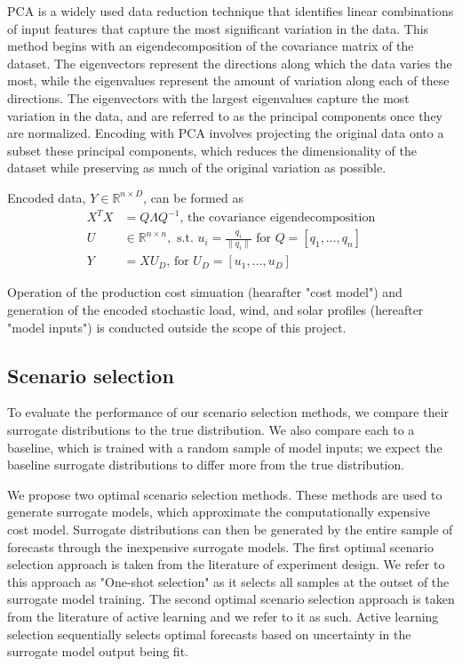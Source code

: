 \documentclass[10pt,twocolumn,letterpaper]{article}
\begin{document}
PCA is a widely used data reduction technique that identifies linear combinations of input features that capture the most significant variation in the data. This method begins with an eigendecomposition of the covariance matrix of the dataset. The eigenvectors represent the directions along which the data varies the most, while the eigenvalues represent the amount of variation along each of these directions. The eigenvectors with the largest eigenvalues capture the most variation in the data, and are referred to as the principal components once they are normalized. Encoding with PCA involves projecting the original data onto a subset these principal components, which reduces the dimensionality of the dataset while preserving as much of the original variation as possible.

Encoded data, $Y \in \mathbb{R}^{n\times D}$, can be formed as 
\begin{align*}
    X^TX &= Q\Lambda Q^{-1} \textrm{, the covariance eigendecomposition}\\
    U &\in \mathbb{R}^{n\times n}, \textrm{ s.t. } u_i = \frac{q_i}{\lVert q_i \rVert} \textrm{ for } Q = [q_1, \dots, q_n]\\
    Y &= XU_D \textrm{, for } U_D = [u_1, \dots, u_D]
\end{align*}

Operation of the production cost simuation (hearafter "cost model") and generation of the encoded stochastic load, wind, and solar profiles (hereafter "model inputs") is conducted outside the scope of this project. 

\subsection{Scenario selection}
To evaluate the performance of our scenario selection methods, we compare their surrogate distributions to the true distribution. We also compare each to a baseline, which is trained with a random sample of model inputs; we expect the baseline surrogate distributions to differ more from the true distribution.

We propose two optimal scenario selection methods. These methods are used to generate surrogate models, which approximate the computationally expensive cost model. Surrogate distributions can then be generated by the entire sample of forecasts through the inexpensive surrogate models. The first optimal scenario selection approach is taken from the literature of experiment design. We refer to this approach as "One-shot selection" as it selects all samples at the outset of the surrogate model training. The second optimal scenario selection approach is taken from the literature of active learning and we refer to it as such. Active learning selection sequentially selects optimal forecasts based on uncertainty in the surrogate model output being fit.
\end{document}
